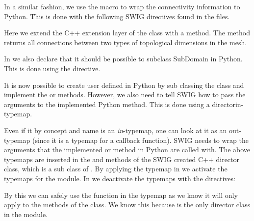In a similar fashion, we use the  macro to wrap the connectivity information to Python. This is done with the following SWIG directives found in the  files.
Here we extend the C++ extension layer of the  class with a  method. The method returns all connections between two types of topological dimensions in the mesh.\par

In  we also declare that it should be possible to subclass SubDomain in Python. This is done using the  directive.
\begin{c++}
\end{c++}
It is now possible to create user defined  in Python by sub classing the  class and implement the  or  methods. However, we also need to tell SWIG how to pass the arguments to the implemented Python method. This is done using a directorin-typemap.
Even if it by concept and name is an \textit{in}-typemap, one can look at it as an out-typemap
(since it is a typemap for a callback function). SWIG needs to wrap the arguments that the implemented  or  method in Python are called with. The above typemaps are inserted in the  and  methods of the SWIG created C++ director class, which is a sub class of . By applying the typemap in  we activate the typemaps for the  module. In  we deactivate the typemaps with the directives:
\begin{c++}
\end{c++}
By this we can safely use the function  in the typemap as we know it will only apply to the methods of the  class. We know this because  is the only director class in the  module.\par

